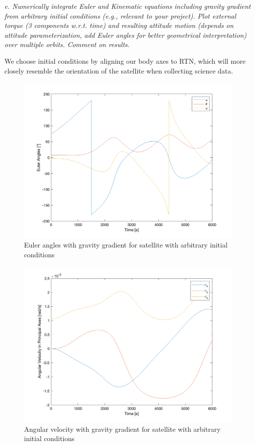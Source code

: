 \textit{e. Numerically integrate Euler and Kinematic equations including gravity gradient from arbitrary initial conditions (e.g., relevant to your project). Plot external torque (3 components w.r.t. time) and resulting attitude motion (depends on attitude parameterization, add Euler angles for better geometrical interpretation) over multiple orbits. Comment on results.}

We choose initial conditions by aligning our body axes to RTN, which will more closely resemble the orientation of the satellite when collecting science data.

\begin{figure}[H]
\centering
\includegraphics[scale=0.6]{Images/ps4_problem4e_angle.png}
\caption{Euler angles with gravity gradient for satellite with arbitrary initial conditions}
\label{fig:ps4_problem4e_angle.png}
\end{figure}

\begin{figure}[H]
\centering
\includegraphics[scale=0.6]{Images/ps4_problem4e_angvel.png}
\caption{Angular velocity with gravity gradient for satellite with arbitrary initial conditions}
\label{fig:ps4_problem4e_angvel.png}
\end{figure}

